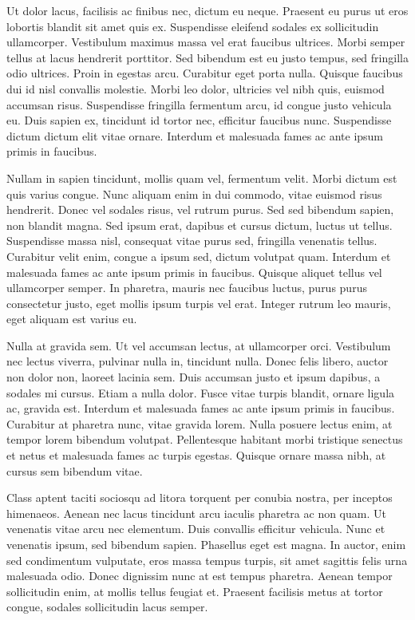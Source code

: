 Ut dolor lacus, facilisis ac finibus nec, dictum eu neque. Praesent eu purus ut eros lobortis blandit sit amet quis ex. Suspendisse eleifend sodales ex sollicitudin ullamcorper. Vestibulum maximus massa vel erat faucibus ultrices. Morbi semper tellus at lacus hendrerit porttitor. Sed bibendum est eu justo tempus, sed fringilla odio ultrices. Proin in egestas arcu. Curabitur eget porta nulla. Quisque faucibus dui id nisl convallis molestie. Morbi leo dolor, ultricies vel nibh quis, euismod accumsan risus. Suspendisse fringilla fermentum arcu, id congue justo vehicula eu. Duis sapien ex, tincidunt id tortor nec, efficitur faucibus nunc. Suspendisse dictum dictum elit vitae ornare. Interdum et malesuada fames ac ante ipsum primis in faucibus.

Nullam in sapien tincidunt, mollis quam vel, fermentum velit. Morbi dictum est quis varius congue. Nunc aliquam enim in dui commodo, vitae euismod risus hendrerit. Donec vel sodales risus, vel rutrum purus. Sed sed bibendum sapien, non blandit magna. Sed ipsum erat, dapibus et cursus dictum, luctus ut tellus. Suspendisse massa nisl, consequat vitae purus sed, fringilla venenatis tellus. Curabitur velit enim, congue a ipsum sed, dictum volutpat quam. Interdum et malesuada fames ac ante ipsum primis in faucibus. Quisque aliquet tellus vel ullamcorper semper. In pharetra, mauris nec faucibus luctus, purus purus consectetur justo, eget mollis ipsum turpis vel erat. Integer rutrum leo mauris, eget aliquam est varius eu.

Nulla at gravida sem. Ut vel accumsan lectus, at ullamcorper orci. Vestibulum nec lectus viverra, pulvinar nulla in, tincidunt nulla. Donec felis libero, auctor non dolor non, laoreet lacinia sem. Duis accumsan justo et ipsum dapibus, a sodales mi cursus. Etiam a nulla dolor. Fusce vitae turpis blandit, ornare ligula ac, gravida est. Interdum et malesuada fames ac ante ipsum primis in faucibus. Curabitur at pharetra nunc, vitae gravida lorem. Nulla posuere lectus enim, at tempor lorem bibendum volutpat. Pellentesque habitant morbi tristique senectus et netus et malesuada fames ac turpis egestas. Quisque ornare massa nibh, at cursus sem bibendum vitae.

Class aptent taciti sociosqu ad litora torquent per conubia nostra, per inceptos himenaeos. Aenean nec lacus tincidunt arcu iaculis pharetra ac non quam. Ut venenatis vitae arcu nec elementum. Duis convallis efficitur vehicula. Nunc et venenatis ipsum, sed bibendum sapien. Phasellus eget est magna. In auctor, enim sed condimentum vulputate, eros massa tempus turpis, sit amet sagittis felis urna malesuada odio. Donec dignissim nunc at est tempus pharetra. Aenean tempor sollicitudin enim, at mollis tellus feugiat et. Praesent facilisis metus at tortor congue, sodales sollicitudin lacus semper.

